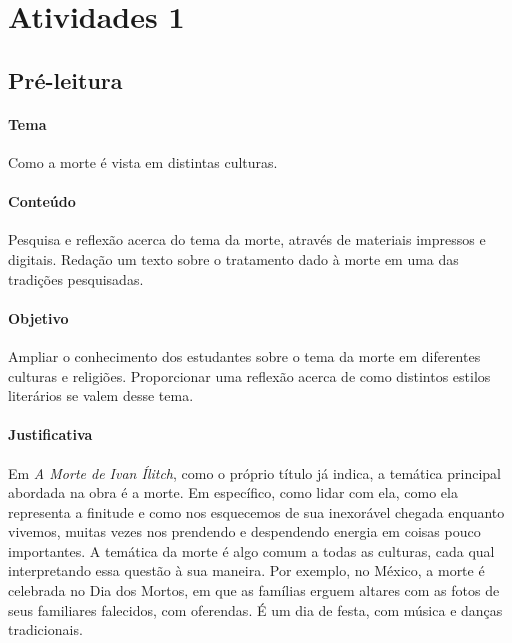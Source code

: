 \documentclass[12pt]{extarticle}
\begin{document}
\tableofcontents

\section{Atividades 1}


\subsection{Pré-leitura}


\paragraph{Tema} Como a morte é vista em distintas culturas.

\paragraph{Conteúdo} Pesquisa e reflexão acerca do tema da morte, 
através de materiais impressos e digitais. Redação um texto
sobre o tratamento dado à morte em uma das tradições pesquisadas. 

\paragraph{Objetivo} Ampliar o conhecimento dos estudantes sobre o tema da morte
em diferentes culturas e religiões. Proporcionar uma reflexão acerca
de como distintos estilos literários se valem desse tema.

\paragraph{Justificativa} Em \emph{A Morte de Ivan Ílitch}, como o próprio título já
indica, a temática principal abordada na obra é a morte. Em específico,
como lidar com ela, como ela representa a finitude e como nos esquecemos
de sua inexorável chegada enquanto vivemos, muitas vezes nos prendendo e
despendendo energia em coisas pouco importantes. A temática da morte é
algo comum a todas as culturas, cada qual interpretando essa questão à
sua maneira. Por exemplo, no México, a morte é celebrada no Dia dos Mortos, em que
as famílias erguem altares com as fotos de seus familiares falecidos, com oferendas.
É um dia de festa, com música e danças tradicionais.
\end{document}
